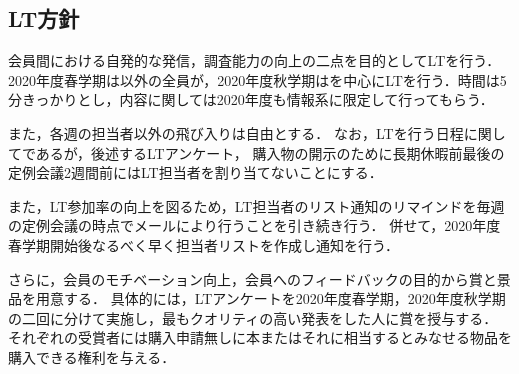 \subsection*{LT方針}

会員間における自発的な発信，調査能力の向上の二点を目的としてLTを行う．
2020年度春学期は\firstGrade{}以外の全員が，2020年度秋学期は\firstGrade{}を中心にLTを行う．時間は5分きっかりとし，内容に関しては2020年度も情報系に限定して行ってもらう．

また，各週の担当者以外の飛び入りは自由とする．
なお，LTを行う日程に関してであるが，後述するLTアンケート，
購入物の開示のために長期休暇前最後の定例会議2週間前にはLT担当者を割り当てないことにする．

また，LT参加率の向上を図るため，LT担当者のリスト通知のリマインドを毎週の定例会議の時点でメールにより行うことを引き続き行う．
併せて，2020年度春学期開始後なるべく早く担当者リストを作成し通知を行う．

さらに，会員のモチベーション向上，会員へのフィードバックの目的から賞と景品を用意する．
具体的には，LTアンケートを2020年度春学期，2020年度秋学期の二回に分けて実施し，最もクオリティの高い発表をした人に賞を授与する．
それぞれの受賞者には購入申請無しに本またはそれに相当するとみなせる物品を購入できる権利を与える．
